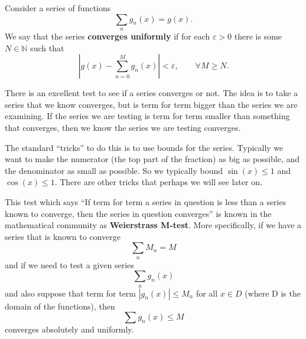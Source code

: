 \begin{defn}
Consider a series of functions
\begin{equation*}
\sum_{n}g_{n}(x) = g(x).
\end{equation*}
We say that the series \textbf{converges uniformly}
if for each $\varepsilon>0$ there is some $N\in\mathbb{N}$
such that
\begin{equation}
|g(x) - \sum^{M}_{n=0}g_{n}(x)|<\varepsilon,\qquad\forall M\geq N.
\end{equation}
\end{defn}
There is an excellent test to
see if a series converges or not. The idea is to take a
series that we know converges, but is term for term bigger
than the series we are examining. If the series we are
testing is term for term smaller than something that
converges, then we know the series we are testing
converges. 

The standard ``tricks'' to do this is to use bounds for the
series. Typically we want to make the numerator (the top
part of the fraction) as big as possible, and the
denominator as small as possible. So we typically bound
$\sin(x)\leq 1$ and $\cos(x)\leq 1$. There are other tricks
that perhaps we will see later on.

This test which says ``If term for term a series in question
is less than a series known to converge, then the series in
question converges'' is known in the mathematical community
as \textbf{Weierstrass M-test}.
More specifically, if we have a series that is known to converge
\begin{equation}
\sum_{n}M_{n} = M
\end{equation}
and if we need to test a given series
\begin{equation*}
\sum_{n}g_{n}(x)
\end{equation*}
and also suppose that term for term $|g_n(x)|\leq M_n$ for
all $x\in D$ (where D is the domain of the functions), then
\begin{equation}
\sum g_{n}(x)\leq M
\end{equation}
converges absolutely and uniformly.

